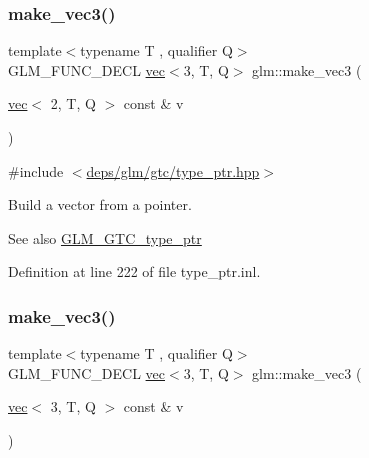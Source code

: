 \subsubsection{\texorpdfstring{make\+\_\+vec3()}{make\_vec3()}\hspace{0.1cm}{\footnotesize\ttfamily [2/5]}}
{\footnotesize\ttfamily template$<$typename T , qualifier Q$>$ \\
G\+L\+M\+\_\+\+F\+U\+N\+C\+\_\+\+D\+E\+CL \hyperlink{structglm_1_1vec}{vec}$<$3, T, Q$>$ glm\+::make\+\_\+vec3 (\begin{DoxyParamCaption}\item[{\hyperlink{structglm_1_1vec}{vec}$<$ 2, T, Q $>$ const \&}]{v }\end{DoxyParamCaption})\hspace{0.3cm}{\ttfamily [inline]}}



{\ttfamily \#include $<$\hyperlink{type__ptr_8hpp}{deps/glm/gtc/type\+\_\+ptr.\+hpp}$>$}

Build a vector from a pointer. \begin{DoxySeeAlso}{See also}
\hyperlink{group__gtc__type__ptr}{G\+L\+M\+\_\+\+G\+T\+C\+\_\+type\+\_\+ptr} 
\end{DoxySeeAlso}


Definition at line 222 of file type\+\_\+ptr.\+inl.

\mbox{\label{group__gtc__type__ptr_gacd57046034df557b8b1c457f58613623}} 
\subsubsection{\texorpdfstring{make\+\_\+vec3()}{make\_vec3()}\hspace{0.1cm}{\footnotesize\ttfamily [3/5]}}
{\footnotesize\ttfamily template$<$typename T , qualifier Q$>$ \\
G\+L\+M\+\_\+\+F\+U\+N\+C\+\_\+\+D\+E\+CL \hyperlink{structglm_1_1vec}{vec}$<$3, T, Q$>$ glm\+::make\+\_\+vec3 (\begin{DoxyParamCaption}\item[{\hyperlink{structglm_1_1vec}{vec}$<$ 3, T, Q $>$ const \&}]{v }\end{DoxyParamCaption})\hspace{0.3cm}{\ttfamily [inline]}}



